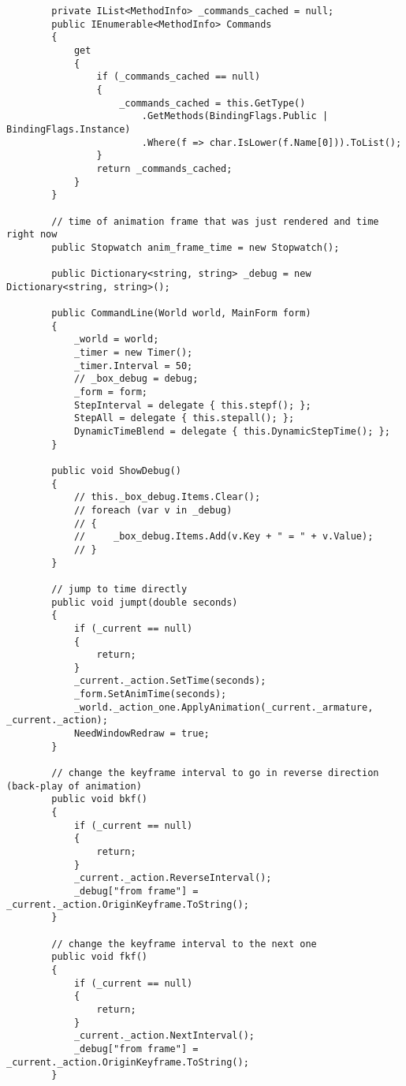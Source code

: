 \begin{scriptsize}
\begin{verbatim}
        private IList<MethodInfo> _commands_cached = null;
        public IEnumerable<MethodInfo> Commands
        {
            get
            {
                if (_commands_cached == null)
                {
                    _commands_cached = this.GetType()
                        .GetMethods(BindingFlags.Public | BindingFlags.Instance)
                        .Where(f => char.IsLower(f.Name[0])).ToList();
                }
                return _commands_cached;
            }
        }

        // time of animation frame that was just rendered and time right now
        public Stopwatch anim_frame_time = new Stopwatch();

        public Dictionary<string, string> _debug = new Dictionary<string, string>();

        public CommandLine(World world, MainForm form)
        {
            _world = world;
            _timer = new Timer();
            _timer.Interval = 50;
            // _box_debug = debug;
            _form = form;
            StepInterval = delegate { this.stepf(); };
            StepAll = delegate { this.stepall(); };
            DynamicTimeBlend = delegate { this.DynamicStepTime(); };
        }

        public void ShowDebug()
        {
            // this._box_debug.Items.Clear();
            // foreach (var v in _debug)
            // {
            //     _box_debug.Items.Add(v.Key + " = " + v.Value);
            // }
        }

        // jump to time directly
        public void jumpt(double seconds)
        {
            if (_current == null)
            {
                return;
            }
            _current._action.SetTime(seconds);
            _form.SetAnimTime(seconds);
            _world._action_one.ApplyAnimation(_current._armature, _current._action);
            NeedWindowRedraw = true;
        }

        // change the keyframe interval to go in reverse direction (back-play of animation)
        public void bkf()
        {
            if (_current == null)
            {
                return;
            }
            _current._action.ReverseInterval();
            _debug["from frame"] = _current._action.OriginKeyframe.ToString();
        }

        // change the keyframe interval to the next one
        public void fkf()
        {
            if (_current == null)
            {
                return;
            }
            _current._action.NextInterval();
            _debug["from frame"] = _current._action.OriginKeyframe.ToString();
        }


\end{verbatim}
\end{scriptsize}
